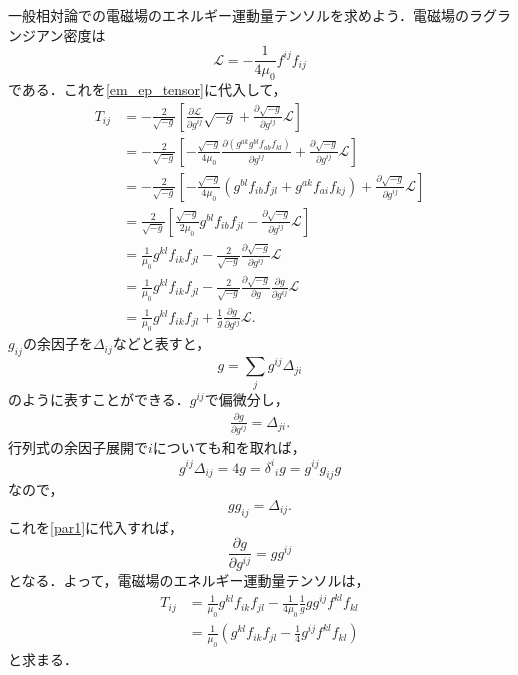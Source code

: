\documentclass[a4paper]{ltjsreport}
\begin{document}
一般相対論での電磁場のエネルギー運動量テンソルを求めよう．電磁場のラグランジアン密度は
\[\mathcal{L}= - \frac{1}{4\mu_0}f^{ij}f_{ij}\]
である．これを\eqref{em_ep_tensor}に代入して，
\begin{align*}
  T_{ij} &=  - \frac{2}{\sqrt{ - g}}\left[\frac{\partial\mathcal{L}}{\partial{g^{ij}}}\sqrt{ - g} + \frac{\partial{\sqrt{ - g}}}{\partial{g^{ij}}}\mathcal{L}\right]\\
  &=  - \frac{2}{\sqrt{ - g}}\left[ - \frac{\sqrt{ - g}}{4\mu_0}\frac{\partial\left(g^{ak}g^{bl}f_{ab}f_{kl}\right)}{\partial{g^{ij}}} + \frac{\partial{\sqrt{ - g}}}{\partial{g^{ij}}}\mathcal{L}\right]\\
  &=  - \frac{2}{\sqrt{ - g}}\left[ - \frac{\sqrt{ - g}}{4\mu_0}\left(g^{bl}f_{ib}f_{jl} + g^{ak}f_{ai}f_{kj}\right) + \frac{\partial{\sqrt{ - g}}}{\partial{g^{ij}}}\mathcal{L}\right]\\
  &= \frac{2}{\sqrt{ - g}}\left[\frac{\sqrt{ - g}}{2\mu_0}g^{bl}f_{ib}f_{jl} - \frac{\partial{\sqrt{ - g}}}{\partial{g^{ij}}}\mathcal{L}\right]\\
  &= \frac{1}{\mu_0}g^{kl}f_{ik}f_{jl} - \frac{2}{\sqrt{ - g}}\frac{\partial{\sqrt{ - g}}}{\partial{g^{ij}}}\mathcal{L}\\
  &= \frac{1}{\mu_0}g^{kl}f_{ik}f_{jl} - \frac{2}{\sqrt{ - g}}\frac{\partial\sqrt{ - g}}{\partial{g}}\frac{\partial{g}}{\partial{g^{ij}}}\mathcal{L}\\
  &= \frac{1}{\mu_0}g^{kl}f_{ik}f_{jl} + \frac{1}{g}\frac{\partial{g}}{\partial{g^{ij}}}\mathcal{L} .
\end{align*}
$g_{ij}$の余因子を$\Delta_{ij}$などと表すと，
\[g=\sum_jg^{ij}\Delta_{ji}\]
のように表すことができる．$g^{ij}$で偏微分し，
\begin{align}
  \frac{\partial{g}}{\partial{g^{ij}}}=\Delta_{ji}\label{par1} .
\end{align}
行列式の余因子展開で$i$についても和を取れば，
\[ g^{ij}\Delta_{ij} = 4g = \delta^i{}_i g = g^{ij}g_{ij} g \]
なので，
\[ gg_{ij}=\Delta_{ij} . \]
これを\eqref{par1}に代入すれば，
\[\frac{\partial{g}}{\partial{g^{ij}}}=gg^{ij}\]
となる．よって，電磁場のエネルギー運動量テンソルは，
\begin{align*}
  T_{ij} &= \frac{1}{\mu_0}g^{kl}f_{ik}f_{jl} - \frac{1}{4\mu_0}\frac{1}{g}gg^{ij}f^{kl}f_{kl}\\
  &= \frac{1}{\mu_0}\left(g^{kl}f_{ik}f_{jl} - \frac{1}{4}g^{ij}f^{kl}f_{kl}\right)
\end{align*}
と求まる．
\end{document}
